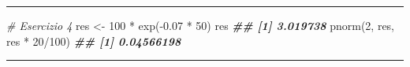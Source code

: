 \documentclass[
  12pt,
]{book}
\newenvironment{Shaded}{\begin{snugshade}}{\end{snugshade}}
\newcommand{\CommentTok}[1]{\textcolor[rgb]{0.56,0.35,0.01}{\textit{#1}}}
\newcommand{\DecValTok}[1]{\textcolor[rgb]{0.00,0.00,0.81}{#1}}
\newcommand{\DocumentationTok}[1]{\textcolor[rgb]{0.56,0.35,0.01}{\textbf{\textit{#1}}}}
\newcommand{\FloatTok}[1]{\textcolor[rgb]{0.00,0.00,0.81}{#1}}
\newcommand{\FunctionTok}[1]{\textcolor[rgb]{0.00,0.00,0.00}{#1}}
\newcommand{\NormalTok}[1]{#1}
\newcommand{\OtherTok}[1]{\textcolor[rgb]{0.56,0.35,0.01}{#1}}
\newcommand{\SpecialCharTok}[1]{\textcolor[rgb]{0.00,0.00,0.00}{#1}}
\begin{document}
\begin{center}\rule{0.5\linewidth}{0.5pt}\end{center}

\begin{Shaded}
\begin{Highlighting}[]
\CommentTok{\# Esercizio 4}
\NormalTok{res }\OtherTok{\textless{}{-}} \DecValTok{100} \SpecialCharTok{*} \FunctionTok{exp}\NormalTok{(}\SpecialCharTok{{-}}\FloatTok{0.07} \SpecialCharTok{*} \DecValTok{50}\NormalTok{)}
\NormalTok{res}
\DocumentationTok{\#\# [1] 3.019738}
\FunctionTok{pnorm}\NormalTok{(}\DecValTok{2}\NormalTok{, res, res }\SpecialCharTok{*} \DecValTok{20}\SpecialCharTok{/}\DecValTok{100}\NormalTok{)}
\DocumentationTok{\#\# [1] 0.04566198}
\end{Highlighting}
\end{Shaded}

\begin{center}\rule{0.5\linewidth}{0.5pt}\end{center}
\end{document}
